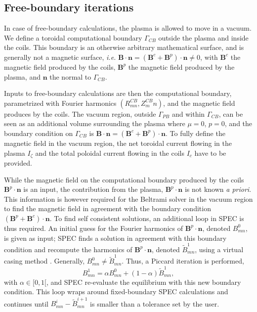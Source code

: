 \documentclass[my_thesis.tex]{subfiles}
\begin{document}
\subsection{Free-boundary iterations}
In case of free-boundary calculations, the plasma is allowed to move in a vacuum. We define a toroidal computational boundary $\Gamma_{CB}$ outside the plasma and inside the coils. This boundary is an otherwise arbitrary mathematical surface, and is generally not a magnetic surface, \textit{i.e.} $\mathbf{B}\cdot\mathbf{n} = (\mathbf{B}^c+\mathbf{B}^p)\cdot\mathbf{n}\neq 0$, with $\mathbf{B}^c$ the magnetic field produced by the coils, $\mathbf{B}^p$ the magnetic field produced by the plasma, and $\mathbf{n}$ the normal to $\Gamma_{CB}$.

Inputs to free-boundary calculations are then the computational boundary, parametrized with Fourier harmonics $(R^{CB}_{mn},Z^{CB}_mn)$, and the magnetic field produces by the coils. The vacuum region, outside $\Gamma_{PB}$ and within $\Gamma_{CB}$, can be seen as an additional volume surrounding the plasma where $\mu=0$, $p=0$, and the boundary condition on $\Gamma_{CB}$ is $\mathbf{B}\cdot\mathbf{n}=(\mathbf{B}^c+\mathbf{B}^p)\cdot\mathbf{n}$. To fully define the magnetic field in the vacuum region, the net toroidal current flowing in the plasma $I_\zeta$ and the total poloidal current flowing in the coils $I_c$ have to be provided.

While the magnetic field on the computational boundary produced by the coils $\mathbf{B}^p\cdot\mathbf{n}$ is an input, the contribution from the plasma, $\mathbf{B}^p\cdot\mathbf{n}$ is not known \textit{a priori}. This information is however required for the Beltrami solver in the vacuum region to find the magnetic field in agreement with the boundary condition $(\mathbf{B}^p+\mathbf{B}^c)\cdot\mathbf{n}$. To find self consistent solutions, an additional loop in SPEC is thus required. An initial guess for the Fourier harmonics of $\mathbf{B}^p\cdot \mathbf{n}$, denoted $B_{mn}^0$, is given as input; SPEC finds a solution in agreement with this boundary condition and recompute the harmonics of $\mathbf{B}^p\cdot\mathbf{n}$, denoted $\tilde{B}_{mn}^1$, using a virtual casing method \citep{Lazerson2012,Hanson2015}. Generally, $B_{mn}^0\neq \tilde{B}_{mn}^1$. Thus, a Piccard iteration is performed,
\begin{equation}
	B_{mn}^1 = \alpha B_{mn}^0 + (1-\alpha) \tilde{B}_{mn}^1,
\end{equation}
with $\alpha\in[0,1[$, and SPEC re-evaluate the equilibrium with this new boundary condition. This loop wraps around fixed-boundary SPEC calculations and continues until $B_{mn}^i -\tilde{B}_{mn}^{i+1}$ is smaller than a tolerance set by the user.
\end{document}
